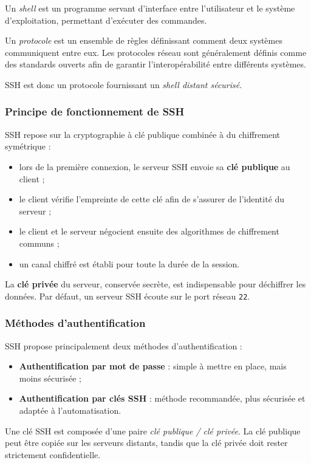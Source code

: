 \documentclass{article}
\begin{document}
Un \emph{shell} est un programme servant d’interface entre l’utilisateur et le système d’exploitation, permettant d’exécuter des commandes.  

Un \emph{protocole} est un ensemble de règles définissant comment deux systèmes communiquent entre eux. Les protocoles réseau sont généralement définis comme des standards ouverts afin de garantir l’interopérabilité entre différents systèmes.

SSH est donc un protocole fournissant un \emph{shell distant sécurisé}.

\subsubsection{Principe de fonctionnement de SSH}

SSH repose sur la cryptographie à clé publique combinée à du chiffrement symétrique :
\begin{itemize}
    \item lors de la première connexion, le serveur SSH envoie sa \textbf{clé publique} au client ;
    \item le client vérifie l’empreinte de cette clé afin de s’assurer de l’identité du serveur ;
    \item le client et le serveur négocient ensuite des algorithmes de chiffrement communs ;
    \item un canal chiffré est établi pour toute la durée de la session.
\end{itemize}

La \textbf{clé privée} du serveur, conservée secrète, est indispensable pour déchiffrer les données.  
Par défaut, un serveur SSH écoute sur le port réseau \texttt{22}.

\subsubsection{Méthodes d’authentification}

SSH propose principalement deux méthodes d’authentification :
\begin{itemize}
    \item \textbf{Authentification par mot de passe} : simple à mettre en place, mais moins sécurisée ;
    \item \textbf{Authentification par clés SSH} : méthode recommandée, plus sécurisée et adaptée à l’automatisation.
\end{itemize}

Une clé SSH est composée d’une paire \emph{clé publique / clé privée}.  
La clé publique peut être copiée sur les serveurs distants, tandis que la clé privée doit rester strictement confidentielle.
\end{document}
